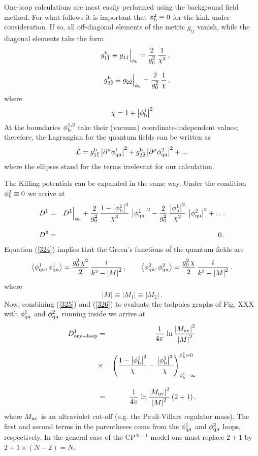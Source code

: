 \documentclass[epsfig,12pt]{article}
\def\beq{\begin{equation}}
\def\eeq{\end{equation}}
\def\beq{\begin{equation}}
\def\eeq{\end{equation}}
\begin{document}
One-loop calculations are most easily performed using the background field method.
For what follows it is important that $\phi^2_{\rm b}\equiv 0$ for the kink under consideration.
If so, all off-diagonal elements of the metric $g_{i\bar j}$ vanish, while the diagonal elements take the form
\begin{eqnarray}
&&
g_{1\bar 1}^{\rm b} \equiv g_{1\bar 1}\Big|_{\phi_{\rm b}} = \frac{2}{g_0^2}\,\frac {1}{\chi^2}\,,\nonumber\\[3mm]
&&
g_{2\bar 2}^{\rm b} \equiv 
g_{2\bar 2}\Big|_{\phi_{\rm b}} = \frac{2}{g_0^2}\,\frac {1}{\chi}\,,
\end{eqnarray}
where
\beq
\chi = 1 + \left| \phi^1_{\rm b}
\right|^2
\eeq
At the boundaries $\phi_{\rm b}^{1,2}$ take their (vacuum) coordinate-independent values;
therefore, the Lagrangian for the quantum fields can be written as
\beq
\mathcal{L}= g_{1\bar 1}^{\rm b} \left| \partial^\mu \phi^1_{\rm qu}\right|^2+
g_{2\bar 2}^{\rm b} \left| \partial^\mu \phi^2_{\rm qu}\right|^2 + ...
\label{324}
\eeq
where the ellipses stand for the terms irrelevant for our calculation.

The Killing potentials can be expanded in the same way. Under the condition $\phi^2_{\rm b}\equiv 0$ 
we arrive at
\begin{eqnarray}
D^1
&=&
 D^1\Big|_{\phi_{\rm b}} + \frac{2}{g_0^2}\, \frac{1-\left| \phi^1_{\rm b}
\right|^2}{\chi^3}\, \left|  \phi^1_{\rm qu}\right|^2 
- \frac{2}{g_0^2}\, \frac{\left| \phi^1_{\rm b}
\right|^2}{\chi^2}\, \left|  \phi^2_{\rm qu}\right|^2 + ...\,,
\nonumber\\[3mm]
D^2
&=&
0\,.
\label{325}
\end{eqnarray}
Equation (\ref{324})
implies that the Green's functions of the quantum fields are
\beq
\left\langle \phi^1_{\rm qu}, \phi^1_{\rm qu}\right\rangle = \frac{g_0^2\,\chi^2 }{2}\, \frac{i}{k^2-\left|M\right|^2}\,,\qquad
\left\langle \phi^2_{\rm qu}, \phi^2_{\rm qu}\right\rangle = \frac{g_0^2\,\chi }{2 }\, \frac{i}{k^2-\left|M\right|^2}\,.
\label{326}
\eeq
where 
\beq
\left|M\right|\equiv \left|M_1\right|\equiv \left|M_2\right|\,.
\eeq
Now, combining (\ref{325}) and (\ref{326}) to evaluate the tadpoles graphs of Fig. XXX
with $\phi^1_{\rm qu}$ and $\phi^2_{\rm qu}$ running inside
we arrive at
\begin{eqnarray}
	D^1_{\rm one-loop} 
	&=&
	\frac{1}{4\pi}\, \ln \frac{\left| M_{\rm uv}\right|^2}{\left|M\right|^2}
 \nonumber\\[3mm]
 	&\times&
	\left( \frac{1-\left| \phi^1_{\rm b}
	  \right|^2}{\chi} - \frac{\left| \phi^1_{\rm b}
	  \right|^2}{\chi}
	\right)^{\phi_{\rm b}^{1}=0}_{\phi_{\rm b}^{1}=\infty}
  \nonumber\\[3mm]
	&=&
	  \frac{1}{4\pi}\, \ln \frac{\left| M_{\rm uv}\right|^2}{\left|M\right|^2}
	  \left(2 + 1
	  \right).
\end{eqnarray}
	where $M_{\rm uv}$ is an ultraviolet cut-off (e.g. the Pauli-Villars regulator mass). 
	The first and second terms in the parentheses come from the $\phi^1_{\rm qu}$ and $\phi^2_{\rm qu}$ loops, respectively. 
	In the general case of the CP$^{N-1}$ model
	one must replace $2+1$ by $2+ 1\times (N-2) = N$.
\end{document}
